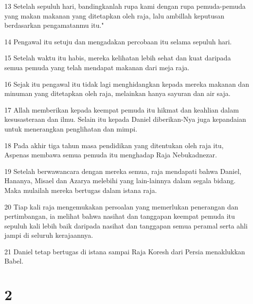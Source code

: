 \par 13 Setelah sepuluh hari, bandingkanlah rupa kami dengan rupa pemuda-pemuda yang makan makanan yang ditetapkan oleh raja, lalu ambillah keputusan berdasarkan pengamatanmu itu."
\par 14 Pengawal itu setuju dan mengadakan percobaan itu selama sepuluh hari.
\par 15 Setelah waktu itu habis, mereka kelihatan lebih sehat dan kuat daripada semua pemuda yang telah mendapat makanan dari meja raja.
\par 16 Sejak itu pengawal itu tidak lagi menghidangkan kepada mereka makanan dan minuman yang ditetapkan oleh raja, melainkan hanya sayuran dan air saja.
\par 17 Allah memberikan kepada keempat pemuda itu hikmat dan keahlian dalam kesusasteraan dan ilmu. Selain itu kepada Daniel diberikan-Nya juga kepandaian untuk menerangkan penglihatan dan mimpi.
\par 18 Pada akhir tiga tahun masa pendidikan yang ditentukan oleh raja itu, Aspenas membawa semua pemuda itu menghadap Raja Nebukadnezar.
\par 19 Setelah berwawancara dengan mereka semua, raja mendapati bahwa Daniel, Hananya, Misael dan Azarya melebihi yang lain-lainnya dalam segala bidang. Maka mulailah mereka bertugas dalam istana raja.
\par 20 Tiap kali raja mengemukakan persoalan yang memerlukan penerangan dan pertimbangan, ia melihat bahwa nasihat dan tanggapan keempat pemuda itu sepuluh kali lebih baik daripada nasihat dan tanggapan semua peramal serta ahli jampi di seluruh kerajaannya.
\par 21 Daniel tetap bertugas di istana sampai Raja Koresh dari Persia menaklukkan Babel.

\chapter{2}


